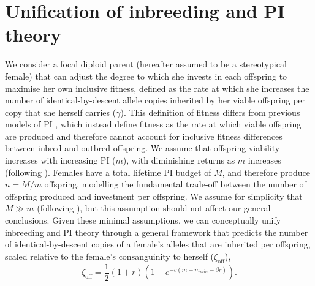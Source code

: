 \documentclass[12pt]{article}
\begin{document}
\section*{Unification of inbreeding and PI theory}

We consider a focal diploid parent (hereafter assumed to be a stereotypical female) that can adjust the degree to which she invests in each offspring to maximise her own inclusive fitness, defined as the rate at which she increases the number of identical-by-descent allele copies inherited by her viable offspring per copy that she herself carries ($\gamma$). This definition of fitness differs from previous models of PI \cite[][]{Macnair1978, Parker1978}, which instead define fitness as the rate at which viable offspring are produced and therefore cannot account for inclusive fitness differences between inbred and outbred offspring. We assume that offspring viability increases with increasing PI ($m$), with diminishing returns as $m$ increases (following \cite[][]{Parker1978}). Females have a total lifetime PI budget of $M$, and therefore produce $n=M/m$ offspring, modelling the fundamental trade-off between the number of offspring produced and investment per offspring. We assume for simplicity that $M \gg m$ (following \cite[][]{Parker1985}), but this assumption should not affect our general conclusions. Given these minimal assumptions, we can conceptually unify inbreeding and PI theory through a general framework that predicts the number of identical-by-descent copies of a female's alleles that are inherited per offspring, scaled relative to the female's consanguinity to herself ($\zeta_{\textrm{off}}$),
\begin{equation} \label{maineq}
\zeta_{\textrm{off}} = \frac{1}{2}\left(1+r\right)\left(1-e^{-c\left(m-m_{min}-\beta r\right)}\right).
\end{equation}
\end{document}
